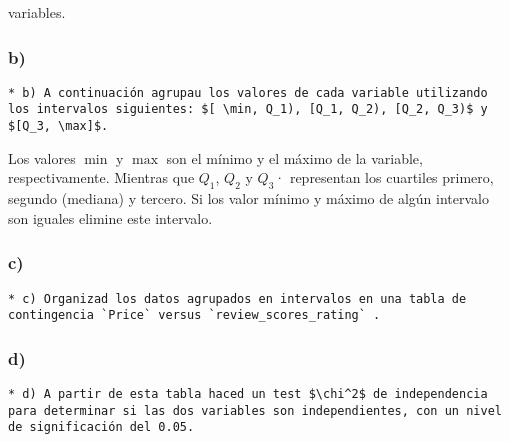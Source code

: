\documentclass[
]{article}
\begin{document}
variables.

\hypertarget{b}{%
\subsubsection{b)}\label{b}}

\begin{verbatim}
* b) A continuación agrupau los valores de cada variable utilizando los intervalos siguientes: $[ \min, Q_1), [Q_1, Q_2), [Q_2, Q_3)$ y $[Q_3, \max]$.
\end{verbatim}

Los valores \(\min\) y \(\max\) son el mínimo y el máximo de la
variable, respectivamente. Mientras que \(Q_1\), \(Q_2\) y \(Q_3\)·
representan los cuartiles primero, segundo (mediana) y tercero. Si los
valor mínimo y máximo de algún intervalo son iguales elimine este
intervalo.

\hypertarget{c}{%
\subsubsection{c)}\label{c}}

\begin{verbatim}
* c) Organizad los datos agrupados en intervalos en una tabla de contingencia `Price` versus `review_scores_rating` .
\end{verbatim}

\hypertarget{d}{%
\subsubsection{d)}\label{d}}

\begin{verbatim}
* d) A partir de esta tabla haced un test $\chi^2$ de independencia para determinar si las dos variables son independientes, con un nivel de significación del 0.05.
\end{verbatim}
\end{document}
